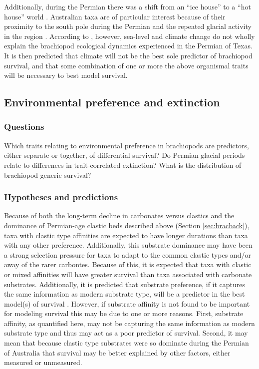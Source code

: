 \documentclass[12pt,letterpaper]{article}
\begin{document}
Additionally, during the Permian there was a shift from an ``ice house'' to a ``hot house'' world \citep{Fielding2006,Birgenheier2010,Jones2006,Powell2007,Fielding2008}. Australian taxa are of particular interest because of their proximity to the south pole during the Permian and the repeated glacial activity in the region \citep{Fielding2008a,Fielding2006,Birgenheier2010,Jones2006}. According to \citet{Olszewski2004}, however, sea-level and climate change do not wholly explain the brachiopod ecological dynamics experienced in the Permian of Texas. It is then predicted that climate will not be the best sole predictor of brachiopod survival, and that some combination of one or more the above organismal traits will be necessary to best model survival. 


\subsection{Environmental preference and extinction} \label{sec:bracsurv}
\subsubsection{Questions} \label{sec:bracsurvques}
Which traits relating to environmental preference in brachiopods are predictors, either separate or together, of differential survival? Do Permian glacial periods relate to differences in trait-correlated extinction? What is the distribution of brachiopod generic survival?

\subsubsection{Hypotheses and predictions} \label{sec:bracsurvpred}
Because of both the long-term decline in carbonates versus clastics \citep{Peters2008} and the dominance of Permian-age clastic beds \citep{Birgenheier2010,Percival2012,Thomas2007,Fielding2008a,Fielding2008} described above (Section \ref{sec:bracback}), taxa with clastic type affinities are expected to have longer durations than taxa with any other preference. Additionally, this substrate dominance may have been a strong selection pressure for taxa to adapt to the common clastic types and/or away of the rarer carbontes. Because of this, it is expected that taxa with clastic or mixed affinities will have greater survival than taxa associated with carbonate substrates. Additionally, it is predicted that substrate preference, if it captures the same information as modern substrate type, will be a predictor in the best model(s) of survival \citep{Richardson1997,Richardson1997a}. However, if substrate affinity is not found to be important for modeling survival this may be due to one or more reasons. First, substrate affinity, as quantified here, may not be capturing the same information as modern substrate type and thus may act as a poor predictor of survival. Second, it may mean that because clastic type substrates were so dominate during the Permian of Australia that survival may be better explained by other factors, either measured or unmeasured. 
\end{document}
